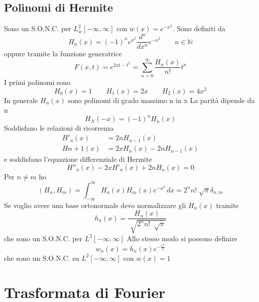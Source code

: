 \documentclass[a4paper,11pt]{report}
\theoremstyle{remark}
\theoremstyle{definition}
\begin{document}
\section{Polinomi di Hermite}

Sono un S.O.N.C. per $L^2_w[-\infty,\infty]$ con $w(x) = e^{-x^2}$. Sono definiti da 
\begin{equation*}
	H_n(x) = {(-1)}^ne^{x^2}\frac{d^n}{dx^n}e^{-x^2} \qquad n\in \mathbb{N}
\end{equation*}
oppure tramite la funzione generatrice 
\begin{equation*}
	F(x,t) = e^{2xt-t^2}=\sum_{n=0}^\infty \frac{H_n(x)}{n!}t^n
\end{equation*}
I primi polinomi sono
\begin{equation*}
	H_0(x)=1 \qquad H_1(x) = 2x \qquad H_2(x)= 4x^2
\end{equation*}
In generale $H_n(x)$ sono polinomi di grado massimo n in x \newline
La parità dipende da n
\begin{equation*}
	H_N(-x)= {(-1)}^nH_n(x) 
\end{equation*}
Soddisfano le relazioni di ricorrenza
\begin{align*}
	H'_n(x) &= 2nH_{n-1}(x)\\
	H{n+1}(x) &= 2xH_n(x)-2nH_{n-1}(x)
\end{align*}
e soddisfano l'equazione differenziale di Hermite
\begin{equation*}
	H''_n(x)-2xH'_n(x)+2nH_n(x)=0
\end{equation*}
Per $n\ne m$ ho
\begin{equation*}
	(H_n,H_m) = \int_{-\infty}^\infty H_n(x)H_m(x)e^{-x^2} \, dx = 2^nn!\sqrt[]{\pi} \delta_{n,m}
\end{equation*}
Se voglio avere una base ortonormale devo normalizzare gli $H_n(x)$ tramite
\begin{equation*}
	h_n(x) = \frac{H_n(x)}{\sqrt[]{2^nn!\;\sqrt[]{\pi}}}
\end{equation*}
che sono un S.O.N.C. per $L^2[-\infty,\infty]$ \newline
Allo stesso modo si possono definire 
\begin{equation*}
	w_n(x)= h_n(x)e^{-\frac{x^2}{2}}
\end{equation*}
che sono un S.O.N.C. su $L^2[-\infty,\infty]$ con $w(x)=1$

\chapter{Trasformata di Fourier}
\end{document}
